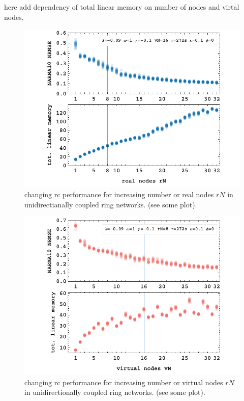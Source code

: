 	here add dependency of total linear memory on number of nodes and virtal nodes.
	
	\begin{figure}
		\centering
		\includegraphics[width=0.9\linewidth]{pics/rNplot}
		\caption{changing rc performance for increasing number or real nodes $rN$ in unidirectianally coupled ring networks. (see some plot).}
		\label{fig:rN_1-32}
	\end{figure}

	\begin{figure}
		\centering
		\includegraphics[width=15cm]{pics/vNplot}
		\caption{changing rc performance for increasing number or virtual nodes $rN$ in unidirectionally coupled ring networks. (see some plot).}
		\label{fig:vN_1-32}
	\end{figure}


